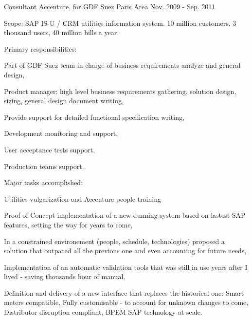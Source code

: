 \begin{cventries}
  \cventry
    {Consultant} %
    {Accenture, for GDF Suez} %
    {Paris Area} %
    {Nov. 2009 - Sep. 2011} %
    {
      \begin{cvitems} %
        \item {Scope: SAP IS-U / CRM utilities information system. 10 million customers, 3 thousand users, 40 million bills a year.}
        \item {Primary responsibilities:}
        \begin{cvsubitems}
          \item {Part of GDF Suez team in charge of business requirements analyze and general design,}
          \item {Product manager: high level business requirements gathering, solution design, sizing, general design document writing,}
          \item {Provide support for detailed functional specification writing,}
          \item {Development monitoring and support,}
          \item {User acceptance tests support,}
          \item {Production teams support.}
        \end{cvsubitems}
        \item {Major tasks accomplished:}
        \begin{cvsubitems}
          \item {Utilities vulgarization and Accenture people training}
          \item {Proof of Concept implementation of a new dunning system based on lastest SAP features, setting the way for years to come,}
          \item {In a constrained environement (people, schedule, technologies) proposed a solution that outpaced all the previous one and even accounting for future needs,}
          \item {Implementation of an automatic validation tools that was still in use years after I lived - saving thousands hour of manual,}
          \item {Definition and delivery of a new interface that replaces the historical one: Smart meters compatible, Fully customisable - to account for unknown changes to come, Distributor disruption compliant, BPEM SAP technology at scale.}
        \end{cvsubitems}
      \end{cvitems}
    }


\end{cventries}
